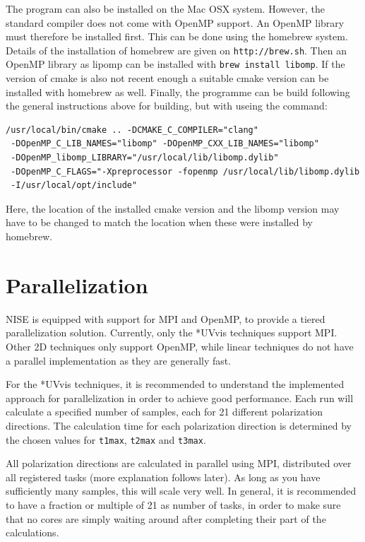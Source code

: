 \documentclass[12pt]{book}
\begin{document}
The program can also be installed on the Mac OSX system. However, the standard compiler does not come with OpenMP support. An OpenMP library must therefore be installed first. This can be done using the homebrew system. Details of the installation of homebrew are given on \texttt{http://brew.sh}. Then an OpenMP library as lipomp can be installed with \texttt{brew install libomp}. If the version of cmake is also not recent enough a suitable cmake version can be installed with homebrew as well. Finally, the programme can be build following the general instructions above for building, but with useing the command:\\
\begin{verbatim}
/usr/local/bin/cmake .. -DCMAKE_C_COMPILER="clang"
 -DOpenMP_C_LIB_NAMES="libomp" -DOpenMP_CXX_LIB_NAMES="libomp"
 -DOpenMP_libomp_LIBRARY="/usr/local/lib/libomp.dylib"
 -DOpenMP_C_FLAGS="-Xpreprocessor -fopenmp /usr/local/lib/libomp.dylib
 -I/usr/local/opt/include"
\end{verbatim}
Here, the location of the installed cmake version and the libomp version may have to be changed to match the location when these were installed by homebrew.

\section{Parallelization}
NISE is equipped with support for MPI and OpenMP, to provide a tiered parallelization solution. Currently, only the *UVvis techniques support MPI. Other 2D techniques only support OpenMP, while linear techniques do not have a parallel implementation as they are generally fast.

For the *UVvis techniques, it is recommended to understand the implemented approach for parallelization in order to achieve good performance. Each run will calculate a specified number of samples, each for 21 different polarization directions. The calculation time for each polarization direction is determined by the chosen values for {\tt t1max}, {\tt t2max} and {\tt t3max}.

All polarization directions are calculated in parallel using MPI, distributed over all registered tasks (more explanation follows later). As long as you have sufficiently many samples, this will scale very well. In general, it is recommended to have a fraction or multiple of 21 as number of tasks, in order to make sure that no cores are simply waiting around after completing their part of the calculations.
\end{document}
